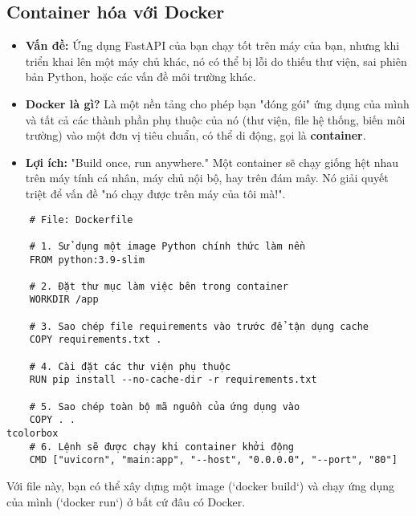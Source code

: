 \subsection{Container hóa với Docker}
\label{ssec:docker}
\begin{itemize}
    \item \textbf{Vấn đề:} Ứng dụng FastAPI của bạn chạy tốt trên máy của bạn, nhưng khi triển khai lên một máy chủ khác, nó có thể bị lỗi do thiếu thư viện, sai phiên bản Python, hoặc các vấn đề môi trường khác.
    \item \textbf{Docker là gì?} Là một nền tảng cho phép bạn "đóng gói" ứng dụng của mình và tất cả các thành phần phụ thuộc của nó (thư viện, file hệ thống, biến môi trường) vào một đơn vị tiêu chuẩn, có thể di động, gọi là \textbf{container}.
    \item \textbf{Lợi ích:} "Build once, run anywhere." Một container sẽ chạy giống hệt nhau trên máy tính cá nhân, máy chủ nội bộ, hay trên đám mây. Nó giải quyết triệt để vấn đề "nó chạy được trên máy của tôi mà!".
\end{itemize}
\begin{tcolorbox}[title=Một Dockerfile đơn giản cho ứng dụng FastAPI, colback=black!5!white, colframe=black!80!white]
    \begin{verbatim}
    # File: Dockerfile

    # 1. Sử dụng một image Python chính thức làm nền
    FROM python:3.9-slim

    # 2. Đặt thư mục làm việc bên trong container
    WORKDIR /app

    # 3. Sao chép file requirements vào trước để tận dụng cache
    COPY requirements.txt .

    # 4. Cài đặt các thư viện phụ thuộc
    RUN pip install --no-cache-dir -r requirements.txt

    # 5. Sao chép toàn bộ mã nguồn của ứng dụng vào
    COPY . .
tcolorbox
    # 6. Lệnh sẽ được chạy khi container khởi động
    CMD ["uvicorn", "main:app", "--host", "0.0.0.0", "--port", "80"]
    \end{verbatim}
\end{tcolorbox}
Với file này, bạn có thể xây dựng một image (`docker build`) và chạy ứng dụng của mình (`docker run`) ở bất cứ đâu có Docker.